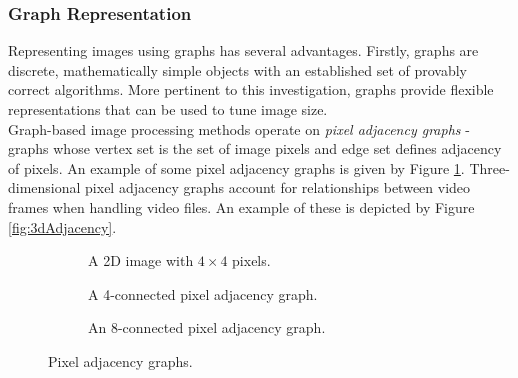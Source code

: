 \setlength{\leftskip}{0cm}
\subsubsection{Graph Representation}
\label{sec:graphReps}
\setlength{\leftskip}{0.5cm}
\indent \indent
Representing images using graphs has several advantages. Firstly, graphs are discrete, mathematically simple objects with an established set of provably correct algorithms. More pertinent to this investigation, graphs provide flexible representations that can be used to tune image size.
\smallskip \\ \indent
Graph-based image processing methods operate on \textit{pixel adjacency graphs} - graphs whose vertex set is the set of image pixels and edge set defines adjacency of pixels. An example of some pixel adjacency graphs is given by Figure \ref{fig:pixelAdjacency}. Three-dimensional pixel adjacency graphs account for relationships between video frames when handling video files. An example of these is depicted by Figure \ref{fig:3dAdjacency}.
\begin{figure}[h!]
    \centering
    \begin{subfigure}[b]{0.29\textwidth}
        \centering
        \captionsetup{justification=centering}
        \scalebox{1}{}
        \caption{A 2D image with $4 \times 4$ pixels.}
    \end{subfigure} \hfill%
    \begin{subfigure}[b]{0.29\textwidth}
        \centering
        \captionsetup{justification=centering}
        \scalebox{1}{}
        \caption{A 4-connected pixel adjacency graph.}
    \end{subfigure} \hfill%
    \begin{subfigure}[b]{0.29\textwidth}
        \centering
        \captionsetup{justification=centering}
        \scalebox{1}{}
        \caption{An 8-connected pixel adjacency graph.}
    \end{subfigure}%
    \caption[Pixel Adjacency Graphs]{Pixel adjacency graphs.}
    \label{fig:pixelAdjacency}
\end{figure}
